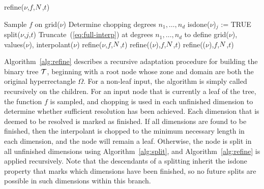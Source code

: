 \begin{algorithm}
\caption{refine($\nu$,$f$,$N$,$t$)}
\label{alg:refine}
\begin{algorithmic}
    \STATE Sample $f$ on \textsf{grid}($\nu$)
    \STATE Determine chopping degrees $n_1,\ldots,n_d$
        \STATE \textsf{isdone}($\nu$)$_j$ := TRUE
      \ELSE
        \STATE split($\nu$,$j$,$t$)
      \ENDIF
    \ENDFOR
      \STATE Truncate~(\ref{eq:full-interp}) at degrees $n_1,\ldots,n_d$ to define \textsf{grid}($\nu$), \textsf{values}($\nu$), \textsf{interpolant}($\nu$)
    \ELSE
      \STATE refine($\nu$,$f$,$N$,$t$)
    \ENDIF
  \ELSE
    \STATE refine(($\nu$),$f$,$N$,$t$)      
    \STATE refine(($\nu$),$f$,$N$,$t$)
  \ENDIF
\end{algorithmic}
\end{algorithm}

Algorithm~\ref{alg:refine}  describes a recursive adaptation procedure for building the binary tree $\mathcal{T}$, beginning with a root node whose zone and domain are both the original hyperrectangle $\Omega$. For a non-leaf input, the algorithm is simply called recursively on the children. For an input node that is currently a leaf of the tree, the function $f$ is sampled, and chopping is used in each unfinished dimension to determine whether sufficient resolution has been achieved. Each dimension that is deemed to be resolved is marked as finished. If all dimensions are found to be finished, then the interpolant is chopped to the minimum necessary length in each dimension, and the node will remain a leaf. Otherwise, the node is split in all unfinished dimensions using Algorithm~\ref{alg:split}, and Algorithm~\ref{alg:refine} is applied recursively. Note that the descendants of a splitting inherit the \textsf{isdone} property that marks which dimensions have been finished, so no future splits are possible in such dimensions within this branch. 

